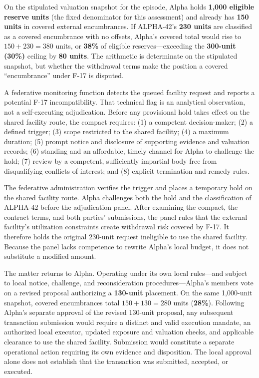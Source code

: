 \documentclass[
  10pt,
]{article}
\begin{document}
On the stipulated valuation snapshot for the episode, Alpha holds
\textbf{1,000 eligible reserve units} (the fixed denominator for this
assessment) and already has \textbf{150 units} in covered external
encumbrances. If ALPHA-42's \textbf{230 units} are classified as a
covered encumbrance with no offsets, Alpha's covered total would rise to
\(150 + 230 = 380\) units, or \textbf{38\%} of eligible
reserves---exceeding the \textbf{300-unit (30\%)} ceiling by \textbf{80
units}. The arithmetic is determinate on the stipulated snapshot, but
whether the withdrawal terms make the position a covered ``encumbrance''
under F-17 is disputed.

A federative monitoring function detects the queued facility request and
reports a potential F-17 incompatibility. That technical flag is an
analytical observation, not a self-executing adjudication. Before any
provisional hold takes effect on the shared facility route, the compact
requires: (1) a competent decision-maker; (2) a defined trigger; (3)
scope restricted to the shared facility; (4) a maximum duration; (5)
prompt notice and disclosure of supporting evidence and valuation
records; (6) standing and an affordable, timely channel for Alpha to
challenge the hold; (7) review by a competent, sufficiently impartial
body free from disqualifying conflicts of interest; and (8) explicit
termination and remedy rules.

The federative administration verifies the trigger and places a
temporary hold on the shared facility route. Alpha challenges both the
hold and the classification of ALPHA-42 before the adjudication panel.
After examining the compact, the contract terms, and both parties'
submissions, the panel rules that the external facility's utilization
constraints create withdrawal risk covered by F-17. It therefore holds
the original 230-unit request ineligible to use the shared facility.
Because the panel lacks competence to rewrite Alpha's local budget, it
does not substitute a modified amount.

The matter returns to Alpha. Operating under its own local rules---and
subject to local notice, challenge, and reconsideration
procedures---Alpha's members vote on a revised proposal authorizing a
\textbf{130-unit} placement. On the same 1,000-unit snapshot, covered
encumbrances total \(150 + 130 = 280\) units (\textbf{28\%}). Following
Alpha's separate approval of the revised 130-unit proposal, any
subsequent transaction submission would require a distinct and valid
execution mandate, an authorized local executor, updated exposure and
valuation checks, and applicable clearance to use the shared facility.
Submission would constitute a separate operational action requiring its
own evidence and disposition. The local approval alone does not
establish that the transaction was submitted, accepted, or executed.
\end{document}
